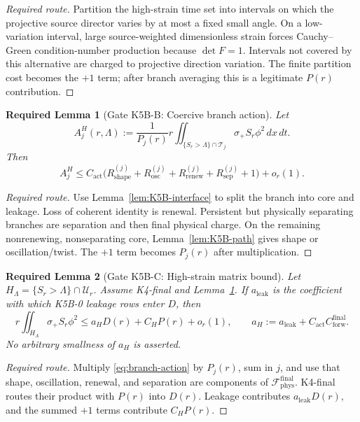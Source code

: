 \documentclass[11pt]{article}
\newtheorem{requiredlemma}{Required Lemma}
\begin{document}
\begin{proof}[Required route]
Partition the high-strain time set into intervals on which the projective
source director varies by at most a fixed small angle.  On a low-variation
interval, large source-weighted dimensionless strain forces Cauchy--Green
condition-number production because \(\det F=1\).  Intervals not covered by
this alternative are charged to projective direction variation.  The finite
partition cost becomes the \(+1\) term; after branch averaging this is a
legitimate \(P(r)\) contribution.
\end{proof}

\begin{requiredlemma}[Gate K5B-B: Coercive branch action]
\label{lem:K5B-branch}
Let
\[
A_j^H(r,\Lambda)
:=
\frac{1}{P_j(r)}
r\iint_{\{S_r>\Lambda\}\cap\mathcal T_j}
\sigma_+S_r\phi^2\,dx\,dt .
\]
Then
\begin{equation}
\label{eq:branch-action}
A_j^H
\le
C_{\mathrm{act}}\big(
R_{\mathrm{shape}}^{(j)}
+R_{\mathrm{osc}}^{(j)}
+R_{\mathrm{renew}}^{(j)}
+R_{\mathrm{sep}}^{(j)}
+1\big)+o_r(1).
\end{equation}
\end{requiredlemma}

\begin{proof}[Required route]
Use Lemma~\ref{lem:K5B-interface} to split the branch into core and leakage.
Loss of coherent identity is renewal.  Persistent but physically separating
branches are separation and then final physical charge.  On the remaining
nonrenewing, nonseparating core, Lemma~\ref{lem:K5B-path} gives shape or
oscillation/twist.  The \(+1\) term becomes \(P_j(r)\) after multiplication.
\end{proof}

\begin{requiredlemma}[Gate K5B-C: High-strain matrix bound]
\label{lem:K5B-bound}
Let \(H_\Lambda=\{S_r>\Lambda\}\cap\mathcal U_r\).  Assume K4-final and
Lemma~\ref{lem:K5B-branch}.  If \(a_{\mathrm{leak}}\) is the coefficient with
which K5B-0 leakage rows enter \(D\), then
\begin{equation}
\label{eq:K5B-bound}
r\iint_{H_\Lambda}\sigma_+S_r\phi^2
\le
a_HD(r)+C_HP(r)+o_r(1),
\qquad
a_H:=a_{\mathrm{leak}}+C_{\mathrm{act}}C_{\mathrm{forw}}^{\mathrm{final}}.
\end{equation}
No arbitrary smallness of \(a_H\) is asserted.
\end{requiredlemma}

\begin{proof}[Required route]
Multiply \eqref{eq:branch-action} by \(P_j(r)\), sum in \(j\), and use that
shape, oscillation, renewal, and separation are components of
\(\mathcal F_{\mathrm{phys}}^{\mathrm{final}}\).  K4-final routes their product
with \(P(r)\) into \(D(r)\).  Leakage contributes \(a_{\mathrm{leak}}D(r)\),
and the summed \(+1\) terms contribute \(C_HP(r)\).
\end{proof}
\end{document}
